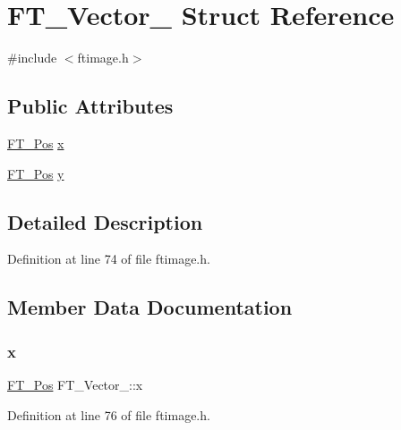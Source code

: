 \hypertarget{struct_f_t___vector__}{}\section{F\+T\+\_\+\+Vector\+\_\+ Struct Reference}
\label{struct_f_t___vector__}


{\ttfamily \#include $<$ftimage.\+h$>$}

\subsection*{Public Attributes}
\begin{DoxyCompactItemize}
\item 
\mbox{\hyperlink{ftimage_8h_af5f230f4b253d4c7715fd2e595614c90}{F\+T\+\_\+\+Pos}} \mbox{\hyperlink{struct_f_t___vector___a941e818e6dfca06409cddff4f325f74c}{x}}
\item 
\mbox{\hyperlink{ftimage_8h_af5f230f4b253d4c7715fd2e595614c90}{F\+T\+\_\+\+Pos}} \mbox{\hyperlink{struct_f_t___vector___ac3246ed214e880047ec74eeb15f8b973}{y}}
\end{DoxyCompactItemize}


\subsection{Detailed Description}


Definition at line 74 of file ftimage.\+h.



\subsection{Member Data Documentation}
\mbox{\label{struct_f_t___vector___a941e818e6dfca06409cddff4f325f74c}} 
\subsubsection{\texorpdfstring{x}{x}}
{\footnotesize\ttfamily \mbox{\hyperlink{ftimage_8h_af5f230f4b253d4c7715fd2e595614c90}{F\+T\+\_\+\+Pos}} F\+T\+\_\+\+Vector\+\_\+\+::x}



Definition at line 76 of file ftimage.\+h.

\mbox{\label{struct_f_t___vector___ac3246ed214e880047ec74eeb15f8b973}} 
